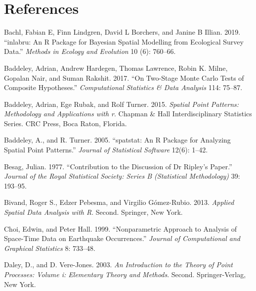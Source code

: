 \hypertarget{references}{%
\section*{References}\label{references}}

\hypertarget{refs}{}
\begin{CSLReferences}{1}{0}
\leavevmode{}%
Bachl, Fabian E, Finn Lindgren, David L Borchers, and Janine B Illian. 2019. {``{inlabru}: An {R} Package for {B}ayesian Spatial Modelling from Ecological Survey Data.''} \emph{Methods in Ecology and Evolution} 10 (6): 760--66.

\leavevmode{}%
Baddeley, Adrian, Andrew Hardegen, Thomas Lawrence, Robin K. Milne, Gopalan Nair, and Suman Rakshit. 2017. {``On Two-Stage {M}onte {C}arlo Tests of Composite Hypotheses.''} \emph{Computational Statistics \& Data Analysis} 114: 75--87.

\leavevmode{}%
Baddeley, Adrian, Ege Rubak, and Rolf Turner. 2015. \emph{Spatial Point Patterns: Methodology and Applications with r}. Chapman \& Hall Interdisciplinary Statistics Series. CRC Press, Boca Raton, Florida.

\leavevmode{}%
Baddeley, A., and R. Turner. 2005. {``{spatstat}: An {R} Package for Analyzing Spatial Point Patterns.''} \emph{Journal of Statistical Software} 12(6): 1--42.

\leavevmode{}%
Besag, Julian. 1977. {``Contribution to the Discussion of Dr {R}ipley's Paper.''} \emph{Journal of the Royal Statistical Society: Series B (Statistical Methodology)} 39: 193--95.

\leavevmode{}%
Bivand, Roger S., Edzer Pebesma, and Virgilio Gómez-Rubio. 2013. \emph{Applied Spatial Data Analysis with {R}}. Second. Springer, New York.

\leavevmode{}%
Choi, Edwin, and Peter Hall. 1999. {``Nonparametric Approach to Analysis of Space-Time Data on Earthquake Occurrences.''} \emph{Journal of Computational and Graphical Statistics} 8: 733--48.

\leavevmode{}%
Daley, D., and D. Vere-Jones. 2003. \emph{An Introduction to the Theory of Point Processes: Volume i: Elementary Theory and Methods}. Second. Springer-Verlag, New York.


\end{CSLReferences}
